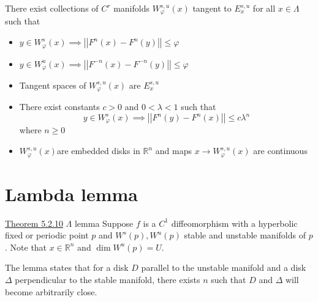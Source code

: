 \documentclass{article}
\begin{document}
 There exist collections of $C^r$ manifolds $W_\varphi^{s,u}(x)$ tangent to $E_x^{s,u}$ for all $x\in\Lambda$ such that 
\begin{itemize}
    \item[a)] $y\in W^s_\varphi (x) \implies \left|\left| F^n(x) - F^n(y) \right|\right| \leq \varphi $
    \item[b)] $y\in W^u_\varphi (x) \implies \left|\left| F^{-n}(x) - F^{-n}(y) \right|\right| \leq \varphi $
    \item[c)] Tangent spaces of $W^{s,u}_\varphi(x)$ are $E^{s,u}_x$
    \item[d)] There exist constants $c>0$ and $0<\lambda<1$ such that \[y\in W^s_\varphi (x) \implies \left|\left| F^n(y) - F^n(x) \right|\right| \leq c\lambda^n \] where $n\geq 0$
    \item[e)] $W^{s,u}_\varphi(x)$are embedded disks in $\mathbb{R}^n$ and maps $x\to W^{s,u}_\varphi(x)$ are continuous
\end{itemize}

\section{Lambda lemma}

\underline{Theorem 5.2.10} $\Lambda$ lemma 
Suppose $f$ is a $C^1$ diffeomorphism with a hyperbolic fixed or periodic point $p$ and $W^s(p),W^u(p)$ stable and unstable manifolds of $p$. Note that $x\in \mathbb{R}^n$ and $\operatorname{dim}W^u(p) = U$.

The lemma states that for a disk $D$ parallel to the unstable manifold and a disk $\Delta$ perpendicular to the stable manifold, there exists $n$ such that $D$ and $\Delta$ will become arbitrarily close.
\end{document}
